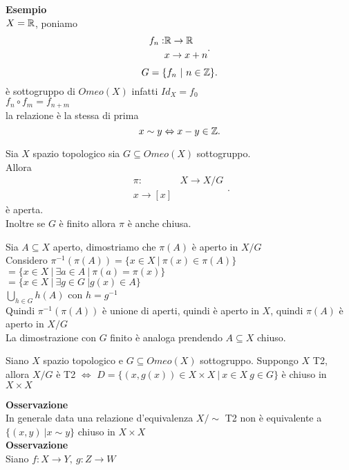 \documentclass[12px]{article}
\begin{document}
\textbf{Esempio}\\
$X = \mathbb{R}$, poniamo 
\[
\begin{aligned}
	f_n: &\mathbb{R} \rightarrow \mathbb{R}\\
	     &x \rightarrow x + n
\end{aligned}
.\] 
\[
	G = \{f_n\ | \ n\in \mathbb{Z}\}
.\]  è sottogruppo di $Omeo(X)$ infatti  $Id_X = f_0$\\
$f_n\circ f_m = f_{n+m}$\\
la relazione è la stessa di prima
 \[
x\sim y \Leftrightarrow x-y\in\mathbb{Z}
.\] 
\begin{prop}
	Sia $X$ spazio topologico sia $G\subseteq Omeo(X)$ sottogruppo.\\
	Allora
	 \[
	\begin{aligned}
		\pi: &X \rightarrow X/G\\
		x \rightarrow [x]
	\end{aligned}
	.\]  è aperta.\\
	Inoltre se $G$ è  finito allora $\pi$ è anche chiusa.
\end{prop}
\begin{dimo}
	Sia $A\subseteq X$ aperto, dimostriamo che $\pi(A)$ è aperto in $X/G$\\
	Considero  $\pi^{-1}(\pi(A)) = \{x\in X \ | \ \pi(x)\in \pi(A)\} $\\
	$= \{x\in X \ | \ \exists a\in A \ | \ \pi(a) = \pi(x)\}$\\
	$ = \{x\in X \ | \ \exists g\in G \ | g(x) \in A\}$ \\
	$ \displaystyle \bigcup^{}_{h\in G}h(A)$ con $h = g^{-1}$ \\
	Quindi $\pi^{-1}(\pi(A))$ è unione di aperti, quindi è aperto in  $X$, quindi $\pi(A)$ è aperto in $X/G$ \\
	La dimostrazione con $G$ finito è analoga prendendo $A\subseteq X$ chiuso.
\end{dimo}
\begin{teo}
	Siano $X$ spazio topologico e $G\subseteq Omeo(X)$ sottogruppo. Suppongo $X$ T2, allora $X/G$ è T2  $ \Leftrightarrow$ $D = \{(x,g(x))\in X\times X\ | \ x\in X\ g\in G\}$ è chiuso in $X\times X$
\end{teo}
\textbf{Osservazione}\\
In generale data una relazione d'equivalenza $X/\sim$ T2 non è equivalente a $\{(x,y)\ | x\sim y\}$ chiuso in $X\times X$\\
 \textbf{Osservazione}\\
 Siano $f:X \rightarrow Y, \ g:Z \rightarrow W$\\
\end{document}

